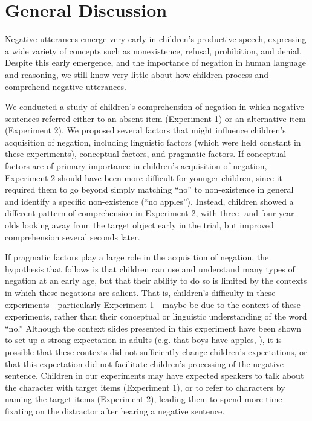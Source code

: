 \documentclass[man]{apa2}
\begin{document}
\section{General Discussion}

Negative utterances emerge very early in children's productive speech, expressing a wide variety of concepts such as nonexistence, refusal, prohibition, and denial.  Despite this early emergence, and the importance of negation in human language and reasoning, we still know very little about how children process and comprehend negative utterances.  

We conducted a study of children's comprehension of negation in which negative sentences referred either to an absent item (Experiment 1) or an alternative item (Experiment 2).  We proposed several factors that might influence children's acquisition of negation, including linguistic factors (which were held constant in these experiments), conceptual factors, and pragmatic factors.  If conceptual factors are of primary importance in children's acquisition of negation, Experiment 2 should have been more difficult for younger children, since it required them to go beyond simply matching ``no'' to non-existence in general and identify a specific non-existence (``no apples'').  Instead, children showed a different pattern of comprehension in Experiment 2, with three- and four-year-olds looking away from the target object early in the trial, but improved comprehension several seconds later.  

If pragmatic factors play a large role in the acquisition of negation, the hypothesis that follows is that children can use and understand many types of negation at an early age, but that their ability to do so is limited by the contexts in which these negations are salient.  That is, children's difficulty in these experiments---particularly Experiment 1---maybe be due to the context of these experiments, rather than their conceptual or linguistic understanding of the word ``no.''  Although the context slides presented in this experiment have been shown to set up a strong expectation in adults (e.g. that boys have apples, ), it is possible that these contexts did not sufficiently change children's expectations, or that this expectation did not facilitate children's processing of the negative sentence.  Children in our experiments may have expected speakers to talk about the character with target items (Experiment 1), or to refer to characters by naming the target items (Experiment 2), leading them to spend more time fixating on the distractor after hearing a negative sentence.
\end{document}

